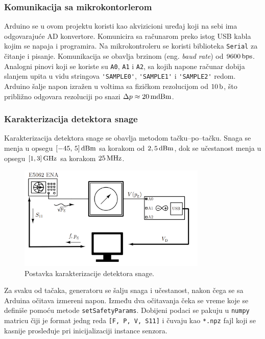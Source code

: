 \documentclass[a4paper, 12pt, diplomski]{etf}
\renewcommand{\unit}[1]{\,{\rm #1}}   %
\begin{document}
\subsubsection{Komunikacija sa mikrokontorlerom}
Arduino se u ovom projektu koristi kao akvizicioni uređaj koji na
sebi ima odgovarajuće AD konvertore. Komunicira sa računarom preko
istog USB kabla kojim se napaja i programira. Na mikrokontroleru 
se koristi biblioteka \verb|Serial| za čitanje i pisanje. 
Komunikacija se obavlja brzinom (eng. \textit{baud rate}) 
od $9600\unit{bps}$. Analogni pinovi koji se koriste su 
\verb|A0|, \verb|A1| i \verb|A2|, sa kojih napone računar dobija 
slanjem upita u vidu stringova \verb|'SAMPLE0'|, \verb|'SAMPLE1'| i \verb|'SAMPLE2'| redom.
Arduino šalje napon izražen u voltima sa fizičkom rezolucijom od 
$10\unit{b}$, što približno odgovara rezoluciji po 
snazi $\Delta p \approx 20\unit{mdBm}$.

\subsubsection{Karakterizacija detektora snage
\label{ss:kds}}
Karakterizacija detektora snage se obavlja metodom tačku--po--tačku.
Snaga se menja u opsegu $[-45,\,5]\unit{dBm}$ sa korakom od 
$2,5\unit{dBm}$, dok se učestanost menja u opsegu $[1, 3]\unit{GHz}$
sa korakom $25\unit{MHz}$.
\begin{figure}[ht!]
    \centering
    \includegraphics[width=0.8\textwidth]{fig/cal_meas.png}
    \caption{Postavka karakterizacije detektora snage.}
    \label{fig:cal}
\end{figure}
Za svaku od tačaka, generatoru se šalju snaga i učestanost,
nakon čega se sa Arduina očitava izmereni napon. 
Između dva očitavanja čeka se vreme koje se definiše
pomoću metode \verb|setSafetyParams|.
Dobijeni podaci se pakuju u \verb|numpy| matricu 
čiji je format jedng reda \verb|[F, P, V, S11]|
i čuvaju kao \verb|*.npz| fajl koji se kasnije prosleđuje
pri inicijalizaciji instance senzora.
\end{document}
